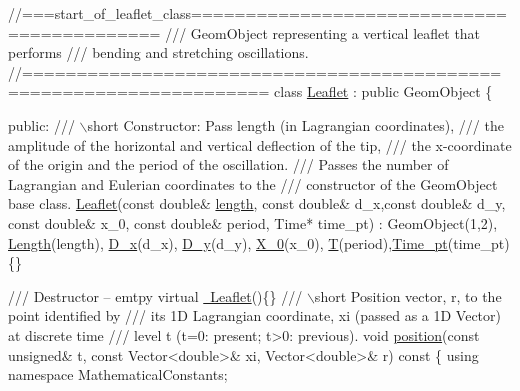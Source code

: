  
\begin{DoxyCodeInclude}
\textcolor{comment}{//===start\_of\_leaflet\_class===========================================}
\textcolor{comment}{/// GeomObject representing a vertical leaflet that performs}
\textcolor{comment}{}\textcolor{comment}{/// bending and stretching oscillations. }
\textcolor{comment}{}\textcolor{comment}{//====================================================================}
\textcolor{keyword}{class }\hyperlink{classLeaflet}{Leaflet} : \textcolor{keyword}{public} GeomObject
\{

\textcolor{keyword}{public}:
\textcolor{comment}{}
\textcolor{comment}{ /// \(\backslash\)short Constructor: Pass length (in Lagrangian coordinates),}
\textcolor{comment}{ /// the amplitude of the horizontal and vertical deflection of the tip,}
\textcolor{comment}{ /// the x-coordinate of the origin and the period of the oscillation.}
\textcolor{comment}{ /// Passes the number of Lagrangian and Eulerian coordinates to the}
\textcolor{comment}{ /// constructor of the GeomObject base class.}
\textcolor{comment}{} \hyperlink{classLeaflet_acb53ccf4578a9981216cf0afd4b38453}{Leaflet}(\textcolor{keyword}{const} \textcolor{keywordtype}{double}& \hyperlink{classLeaflet_a7a28827b7081107ac9e33087598ca868}{length}, \textcolor{keyword}{const} \textcolor{keywordtype}{double}& d\_x,\textcolor{keyword}{const} \textcolor{keywordtype}{double}& d\_y,
         \textcolor{keyword}{const} \textcolor{keywordtype}{double}& x\_0, \textcolor{keyword}{const} \textcolor{keywordtype}{double}& period, Time* time\_pt)
  : GeomObject(1,2), \hyperlink{classLeaflet_a64c27b796ceece358d09d137f15bbf20}{Length}(length), \hyperlink{classLeaflet_a473b6f4ef98bfba9e2c6974027ba4f4b}{D\_x}(d\_x), \hyperlink{classLeaflet_af9c75c7aeecae4b14f7ba0fb245eb8ee}{D\_y}(d\_y), \hyperlink{classLeaflet_a29a25366a0cf97ad0dd36172fdfa3d0c}{X\_0}(x\_0),
   \hyperlink{classLeaflet_a0d78b5fb3ec71009d4a9bcc79f8a85a9}{T}(period),\hyperlink{classLeaflet_ac10f13ad45456dc714ab57042861de53}{Time\_pt}(time\_pt) \{\}

\textcolor{comment}{}
\textcolor{comment}{ /// Destructor -- emtpy}
\textcolor{comment}{} \textcolor{keyword}{virtual} \hyperlink{classLeaflet_a0bbfaeec2534389b203fd2a2316db859}{~Leaflet}()\{\}
\textcolor{comment}{}
\textcolor{comment}{ /// \(\backslash\)short Position vector, r, to the point identified by  }
\textcolor{comment}{ /// its 1D Lagrangian coordinate, xi (passed as a 1D Vector) at discrete time}
\textcolor{comment}{ /// level t (t=0: present; t>0: previous).}
\textcolor{comment}{} \textcolor{keywordtype}{void} \hyperlink{classLeaflet_a5b78c2735652b6a5c08c6aa9d38b6232}{position}(\textcolor{keyword}{const} \textcolor{keywordtype}{unsigned}& t, \textcolor{keyword}{const} Vector<double>& xi, 
               Vector<double>& r)\textcolor{keyword}{ const}
\textcolor{keyword}{  }\{
    \textcolor{keyword}{using namespace }MathematicalConstants;


\end{DoxyCodeInclude}

